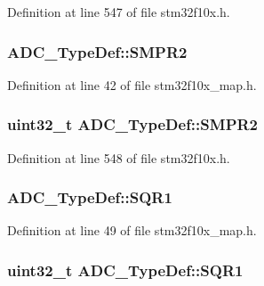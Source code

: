 Definition at line 547 of file stm32f10x.\+h.

\subsubsection[{\texorpdfstring{S\+M\+P\+R2}{SMPR2}}]{ A\+D\+C\+\_\+\+Type\+Def\+::\+S\+M\+P\+R2}\hypertarget{struct_a_d_c___type_def_ad8d4a246376e7ed436007a2c5efb2631}{}\label{struct_a_d_c___type_def_ad8d4a246376e7ed436007a2c5efb2631}


Definition at line 42 of file stm32f10x\+\_\+map.\+h.

\subsubsection[{\texorpdfstring{S\+M\+P\+R2}{SMPR2}}]{ {\bf uint32\+\_\+t} A\+D\+C\+\_\+\+Type\+Def\+::\+S\+M\+P\+R2}\hypertarget{struct_a_d_c___type_def_a9e68fe36c4c8fbbac294b5496ccf7130}{}\label{struct_a_d_c___type_def_a9e68fe36c4c8fbbac294b5496ccf7130}


Definition at line 548 of file stm32f10x.\+h.

\subsubsection[{\texorpdfstring{S\+Q\+R1}{SQR1}}]{ A\+D\+C\+\_\+\+Type\+Def\+::\+S\+Q\+R1}\hypertarget{struct_a_d_c___type_def_a48ac3069e8e6410ced39acb5b3965a8c}{}\label{struct_a_d_c___type_def_a48ac3069e8e6410ced39acb5b3965a8c}


Definition at line 49 of file stm32f10x\+\_\+map.\+h.

\subsubsection[{\texorpdfstring{S\+Q\+R1}{SQR1}}]{ {\bf uint32\+\_\+t} A\+D\+C\+\_\+\+Type\+Def\+::\+S\+Q\+R1}\hypertarget{struct_a_d_c___type_def_a0185aa54962ba987f192154fb7a2d673}{}\label{struct_a_d_c___type_def_a0185aa54962ba987f192154fb7a2d673}


